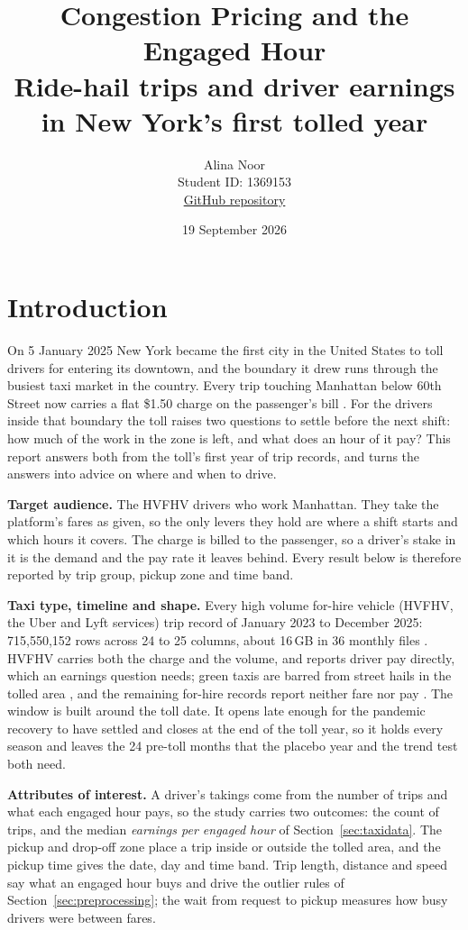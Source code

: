 \documentclass[11pt]{article}
\title{\vspace{-2.5em}\textbf{Congestion Pricing and the Engaged Hour} \\ Ride-hail trips and driver earnings in New York's first tolled year}
\author{
Alina Noor \\
Student ID: 1369153 \\
\href{https://github.com/aloonsballoons/mast30034-project1}{GitHub repository}
}
\date{19 September 2026}
\begin{document}
\maketitle

\section{Introduction}
\label{sec:intro}
On 5 January 2025 New York became the first city in the United States to toll drivers for entering its downtown, and the boundary it drew runs through the busiest taxi market in the country. Every trip touching Manhattan below 60th Street now carries a flat \$1.50 charge on the passenger's bill \cite{mtacbdzones}. For the drivers inside that boundary the toll raises two questions to settle before the next shift: how much of the work in the zone is left, and what does an hour of it pay? This report answers both from the toll's first year of trip records, and turns the answers into advice on where and when to drive.

\textbf{Target audience.} The HVFHV drivers who work Manhattan. They take the platform's fares as given, so the only levers they hold are where a shift starts and which hours it covers. The charge is billed to the passenger, so a driver's stake in it is the demand and the pay rate it leaves behind. Every result below is therefore reported by trip group, pickup zone and time band.

\textbf{Taxi type, timeline and shape.} Every high volume for-hire vehicle (HVFHV, the Uber and Lyft services) trip record of January 2023 to December 2025: 715,550,152 rows across 24 to 25 columns, about 16\,GB in 36 monthly files \cite{tlctripdata}. HVFHV carries both the charge and the volume, and reports driver pay directly, which an earnings question needs; green taxis are barred from street hails in the tolled area \cite{tlcgreen}, and the remaining for-hire records report neither fare nor pay \cite{tlcfhvdict}. The window is built around the toll date. It opens late enough for the pandemic recovery to have settled and closes at the end of the toll year, so it holds every season and leaves the 24 pre-toll months that the placebo year and the trend test both need.

\textbf{Attributes of interest.} A driver's takings come from the number of trips and what each engaged hour pays, so the study carries two outcomes: the count of trips, and the median \emph{earnings per engaged hour} of Section~\ref{sec:taxidata}. The pickup and drop-off zone place a trip inside or outside the tolled area, and the pickup time gives the date, day and time band. Trip length, distance and speed say what an engaged hour buys and drive the outlier rules of Section~\ref{sec:preprocessing}; the wait from request to pickup measures how busy drivers were between fares.
\end{document}
